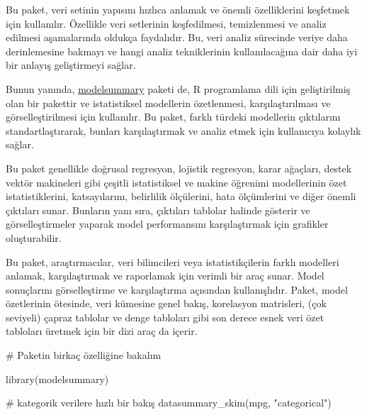 \documentclass[
  letterpaper,
  DIV=11,
  numbers=noendperiod]{scrreprt}
\newenvironment{Shaded}{\begin{snugshade}}{\end{snugshade}}
\newcommand{\CommentTok}[1]{\textcolor[rgb]{0.37,0.37,0.37}{#1}}
\newcommand{\FunctionTok}[1]{\textcolor[rgb]{0.28,0.35,0.67}{#1}}
\newcommand{\NormalTok}[1]{\textcolor[rgb]{0.00,0.23,0.31}{#1}}
\newcommand{\StringTok}[1]{\textcolor[rgb]{0.13,0.47,0.30}{#1}}
\begin{document}
Bu paket, veri setinin yapısını hızlıca anlamak ve önemli özelliklerini
keşfetmek için kullanılır. Özellikle veri setlerinin keşfedilmesi,
temizlenmesi ve analiz edilmesi aşamalarında oldukça faydalıdır. Bu,
veri analiz sürecinde veriye daha derinlemesine bakmayı ve hangi analiz
tekniklerinin kullanılacağına dair daha iyi bir anlayış geliştirmeyi
sağlar.

Bunun yanında, \href{https://modelsummary.com/}{modelsummary} paketi de,
R programlama dili için geliştirilmiş olan bir pakettir ve istatistiksel
modellerin özetlenmesi, karşılaştırılması ve görselleştirilmesi için
kullanılır. Bu paket, farklı türdeki modellerin çıktılarını
standartlaştırarak, bunları karşılaştırmak ve analiz etmek için
kullanıcıya kolaylık sağlar.

Bu paket genellikle doğrusal regresyon, lojistik regresyon, karar
ağaçları, destek vektör makineleri gibi çeşitli istatistiksel ve makine
öğrenimi modellerinin özet istatistiklerini, katsayılarını, belirlilik
ölçülerini, hata ölçümlerini ve diğer önemli çıktıları sunar. Bunların
yanı sıra, çıktıları tablolar halinde gösterir ve görselleştirmeler
yaparak model performansını karşılaştırmak için grafikler oluşturabilir.

Bu paket, araştırmacılar, veri bilimcileri veya istatistikçilerin farklı
modelleri anlamak, karşılaştırmak ve raporlamak için verimli bir araç
sunar. Model sonuçlarını görselleştirme ve karşılaştırma açısından
kullanışlıdır. Paket, model özetlerinin ötesinde, veri kümesine genel
bakış, korelasyon matrisleri, (çok seviyeli) çapraz tablolar ve denge
tabloları gibi son derece esnek veri özet tabloları üretmek için bir
dizi araç da içerir.

\begin{Shaded}
\begin{Highlighting}[]
\CommentTok{\# Paketin birkaç özelliğine bakalım}

\FunctionTok{library}\NormalTok{(modelsummary)}

\CommentTok{\# kategorik verilere hızlı bir bakış}
\FunctionTok{datasummary\_skim}\NormalTok{(mpg, }\StringTok{"categorical"}\NormalTok{)}
\end{Highlighting}
\end{Shaded}
\end{document}
